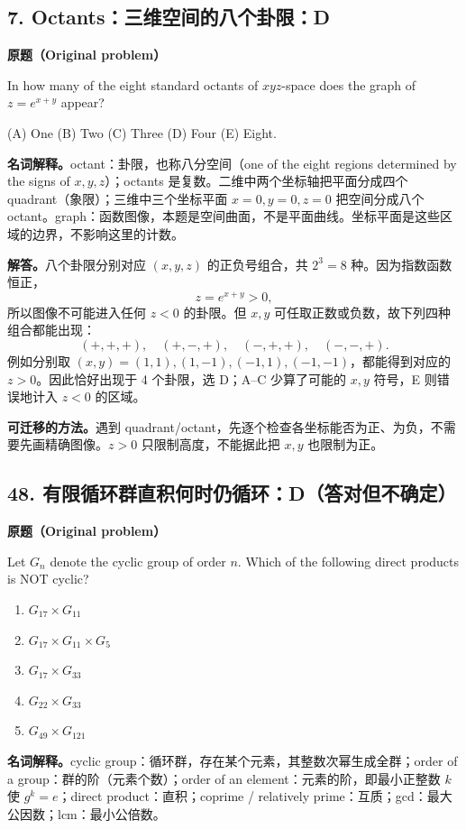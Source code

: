 \documentclass[11pt,a4paper,fontset=fandol]{ctexart}
\begin{document}
\subsection{7. Octants：三维空间的八个卦限：D}
\label{p3:q7}
\textbf{原题（Original problem）}

In how many of the eight standard octants of $xyz$-space does the graph of $z=e^{x+y}$ appear?

(A) One \quad (B) Two \quad (C) Three \quad (D) Four \quad (E) Eight.

\textbf{名词解释。}octant：卦限，也称八分空间（one of the eight regions determined by the signs of $x,y,z$）；octants 是复数。二维中两个坐标轴把平面分成四个 quadrant（象限）；三维中三个坐标平面 $x=0,y=0,z=0$ 把空间分成八个 octant。graph：函数图像，本题是空间曲面，不是平面曲线。坐标平面是这些区域的边界，不影响这里的计数。

\textbf{解答。}八个卦限分别对应 $(x,y,z)$ 的正负号组合，共 $2^3=8$ 种。因为指数函数恒正，
\[
z=e^{x+y}>0,
\]
所以图像不可能进入任何 $z<0$ 的卦限。但 $x,y$ 可任取正数或负数，故下列四种组合都能出现：
\[
(+,+,+),\quad (+,-,+),\quad (-,+,+),\quad (-,-,+).
\]
例如分别取 $(x,y)=(1,1),(1,-1),(-1,1),(-1,-1)$，都能得到对应的 $z>0$。因此恰好出现于 4 个卦限，选 D；A--C 少算了可能的 $x,y$ 符号，E 则错误地计入 $z<0$ 的区域。

\textbf{可迁移的方法。}遇到 quadrant/octant，先逐个检查各坐标能否为正、为负，不需要先画精确图像。$z>0$ 只限制高度，不能据此把 $x,y$ 也限制为正。

\subsection{48. 有限循环群直积何时仍循环：D（答对但不确定）}
\label{p3:q48}
\textbf{原题（Original problem）}

Let $G_n$ denote the cyclic group of order $n$. Which of the following direct products is NOT cyclic?
\begin{enumerate}[label=(\Alph*)]
\item $G_{17}\times G_{11}$
\item $G_{17}\times G_{11}\times G_5$
\item $G_{17}\times G_{33}$
\item $G_{22}\times G_{33}$
\item $G_{49}\times G_{121}$
\end{enumerate}
\textbf{名词解释。}cyclic group：循环群，存在某个元素，其整数次幂生成全群；order of a group：群的阶（元素个数）；order of an element：元素的阶，即最小正整数 $k$ 使 $g^k=e$；direct product：直积；coprime / relatively prime：互质；gcd：最大公因数；lcm：最小公倍数。
\end{document}
